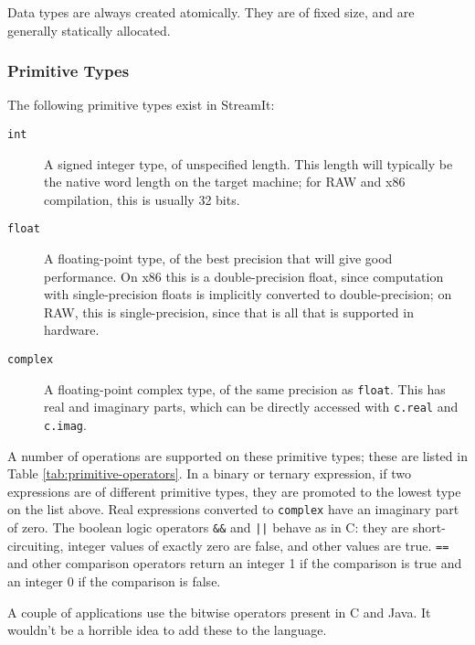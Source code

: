 \documentclass[11pt]{article}
\begin{document}
Data types are always created atomically.  They are of fixed size, and
are generally statically allocated.

\subsubsection{Primitive Types}

The following primitive types exist in StreamIt:

\begin{description}
\item[\lstinline|int|]  A signed integer type, of unspecified length.
  This length will typically be the native word length on the target
  machine; for RAW and x86 compilation, this is usually 32 bits.

\item[\lstinline|float|]  A floating-point type, of the best precision
  that will give good performance.  On x86 this is a double-precision
  float, since computation with single-precision floats is implicitly
  converted to double-precision; on RAW, this is single-precision,
  since that is all that is supported in hardware.

\item[\lstinline|complex|]  A floating-point complex type, of the same
  precision as \lstinline|float|.  This has real and imaginary parts,
  which can be directly accessed with \lstinline|c.real| and
  \lstinline|c.imag|.
\end{description}

\label{sec:operators}
A number of operations are supported on these primitive types; these
are listed in Table \ref{tab:primitive-operators}.  In a
binary or ternary expression, if two expressions are of different
primitive types, they are promoted to the lowest type on the list
above.  Real expressions converted to \lstinline|complex| have an
imaginary part of zero.  The boolean logic operators \lstinline|&&|
and \lstinline/||/ behave as in C: they are short-circuiting, integer
values of exactly zero are false, and other values are true.
\lstinline|==| and other comparison operators return an integer 1 if the
comparison is true and an integer 0 if the comparison is false.

\begin{note}
A couple of applications use the bitwise operators present in C and
Java.  It wouldn't be a horrible idea to add these to the language.
\end{note}
\end{document}
